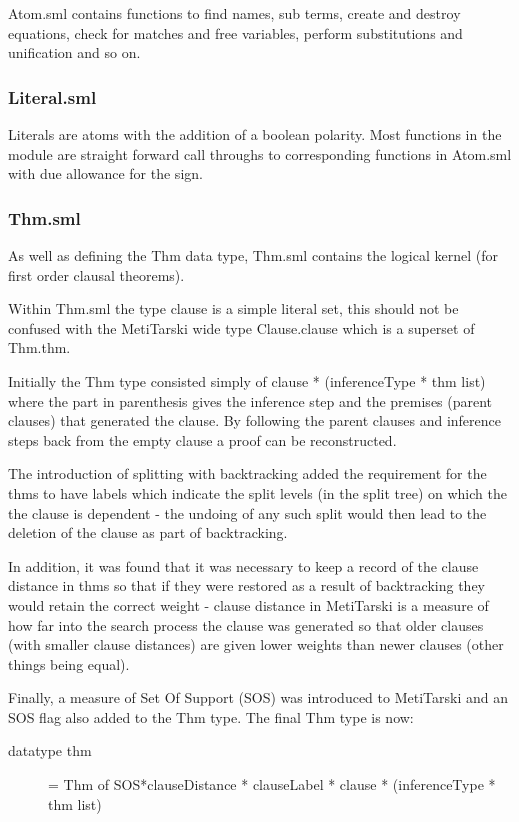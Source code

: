 \documentclass[11pt, oneside]{article}   	%
\begin{document}
Atom.sml contains functions to find names, sub terms, create and destroy equations, check for matches and free variables, perform substitutions and unification and so on.

\subsubsection{Literal.sml}

Literals are atoms with the addition of a boolean polarity. Most functions in the module are straight forward call throughs to corresponding
functions in Atom.sml with due allowance for the sign.

\subsubsection{Thm.sml}
As well as defining the Thm data type, Thm.sml contains the logical kernel (for first order clausal theorems).

Within Thm.sml the type clause is a simple literal set, this should not be confused with the MetiTarski wide type Clause.clause which is a superset of Thm.thm.

Initially the Thm type consisted simply of clause * (inferenceType * thm list) where the part in parenthesis gives the inference step and the premises (parent clauses) that generated the clause. By following the
parent clauses and inference steps back from the empty clause a proof can be reconstructed.

The introduction of splitting with backtracking added the requirement for the thms to have labels which indicate the split levels (in the split tree) on which the the clause is dependent - the undoing of any such split would then lead to the deletion of the clause as part of backtracking.

In addition, it was found that it was necessary to keep a record of the clause distance in thms so that if they were restored as a result of backtracking they would retain the correct weight - clause distance in MetiTarski is a measure of how far into the search process the clause was generated so that older clauses (with smaller clause distances) are given lower weights than newer clauses (other things being equal).

Finally, a measure of Set Of Support (SOS) was introduced to MetiTarski and an SOS flag also added to the Thm type. The final Thm type is now:
\begin{description}
\item[datatype thm] = Thm of SOS*clauseDistance * clauseLabel * clause * (inferenceType * thm list)
\end{description}
\end{document}
